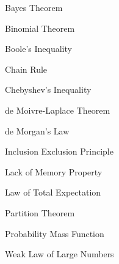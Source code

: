 \documentclass[11pt,a4paper]{article}
\begin{document}
\begin{theorem}{Bayes Theorem}

\end{theorem}

\begin{theorem}{Binomial Theorem}

\end{theorem}

\begin{theorem}{Boole's Inequality}

\end{theorem}

\begin{theorem}{Chain Rule}

\end{theorem}

\begin{theorem}{Chebyshev's Inequality}

\end{theorem}

\begin{theorem}{de Moivre-Laplace Theorem}

\end{theorem}

\begin{theorem}{de Morgan's Law}

\end{theorem}

\begin{theorem}{Inclusion Exclusion Principle}

\end{theorem}

\begin{theorem}{Lack of Memory Property}

\end{theorem}


\begin{theorem}{Law of Total Expectation}

\end{theorem}

\begin{theorem}{Partition Theorem}

\end{theorem}

\begin{theorem}{Probability Mass Function}

\end{theorem}

\begin{theorem}{Weak Law of Large Numbers}

\end{theorem}
\end{document}
